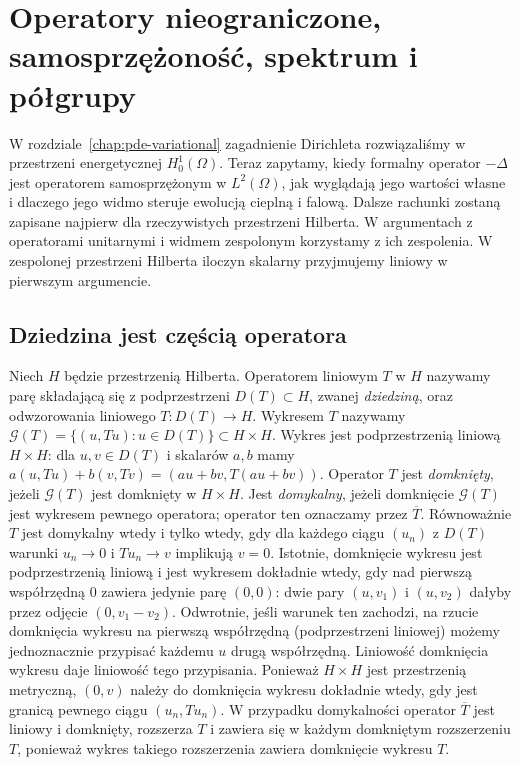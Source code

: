 \chapter[Operatory nieograniczone i teoria spektralna]{Operatory nieograniczone, samosprzężoność, spektrum i półgrupy}
\label{chap:pde12}

\providecommand{\atlasref}[2]{#2}

W rozdziale~\ref{chap:pde-variational} zagadnienie Dirichleta rozwiązaliśmy
w przestrzeni energetycznej $H_0^1(\Omega)$. Teraz zapytamy, kiedy
formalny operator $-\Delta$ jest operatorem samosprzężonym w
$L^2(\Omega)$, jak wyglądają jego wartości własne i dlaczego
jego widmo steruje ewolucją cieplną i falową. Dalsze rachunki
zostaną zapisane najpierw dla rzeczywistych przestrzeni Hilberta.
W argumentach z operatorami unitarnymi i widmem zespolonym
korzystamy z ich zespolenia. W zespolonej przestrzeni Hilberta
iloczyn skalarny przyjmujemy liniowy w pierwszym argumencie.

\section{Dziedzina jest częścią operatora}
\label{sec:pde12-domain}

\begin{definicja}
\label{def:pde12-operator}
Niech $H$ będzie przestrzenią Hilberta. Operatorem liniowym
$T$ w $H$ nazywamy parę składającą się z podprzestrzeni
$D(T)\subset H$, zwanej \emph{dziedziną}, oraz odwzorowania
liniowego $T:D(T)\to H$. Wykresem $T$ nazywamy
$\mathcal G(T)=\{(u,Tu):u\in D(T)\}\subset H\times H$.
Wykres jest podprzestrzenią liniową $H\times H$:
dla $u,v\in D(T)$ i skalarów $a,b$ mamy
$a(u,Tu)+b(v,Tv)=(au+bv,T(au+bv))$.
Operator $T$ jest \emph{domknięty}, jeżeli $\mathcal G(T)$ jest
domknięty w $H\times H$. Jest \emph{domykalny}, jeżeli
domknięcie $\mathcal G(T)$ jest wykresem pewnego operatora;
operator ten oznaczamy przez $\overline T$.
Równoważnie $T$ jest domykalny wtedy i tylko wtedy, gdy
dla każdego ciągu $(u_n)$ z $D(T)$ warunki
$u_n\to0$ i $Tu_n\to v$ implikują $v=0$.
Istotnie, domknięcie wykresu jest podprzestrzenią liniową
i jest wykresem dokładnie wtedy, gdy nad pierwszą współrzędną
$0$ zawiera jedynie parę $(0,0)$: dwie pary $(u,v_1)$
i $(u,v_2)$ dałyby przez odjęcie $(0,v_1-v_2)$.
Odwrotnie, jeśli warunek ten zachodzi, na rzucie domknięcia
wykresu na pierwszą współrzędną (podprzestrzeni liniowej)
możemy jednoznacznie przypisać każdemu $u$ drugą współrzędną.
Liniowość domknięcia wykresu daje liniowość tego przypisania.
Ponieważ $H\times H$ jest przestrzenią metryczną,
$(0,v)$ należy do domknięcia wykresu dokładnie wtedy,
gdy jest granicą pewnego ciągu $(u_n,Tu_n)$.
W przypadku domykalności operator $\overline T$ jest
liniowy i domknięty, rozszerza $T$ i zawiera się w każdym
domkniętym rozszerzeniu $T$, ponieważ wykres takiego
rozszerzenia zawiera domknięcie wykresu $T$.
\end{definicja}

